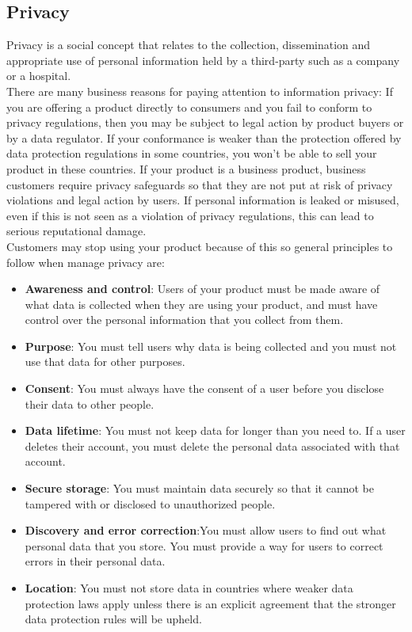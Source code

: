 \documentclass[10pt,a4paper]{report}
\begin{document}
\subsection{Privacy}
Privacy is a social concept that relates to the collection, dissemination and appropriate use of personal information held by a third-party such as a company or a hospital.\\
There are many business reasons for paying attention to information privacy: If you are offering a product directly to consumers and you fail to conform to privacy regulations, then you may be subject to legal action by product buyers or by a data regulator. If your conformance is weaker than the protection offered by data protection regulations in some countries, you won’t be able to sell your product in these countries. If your product is a business product, business customers require privacy safeguards so that they are not put at risk of privacy violations and legal action by users. If personal information is leaked or misused, even if this is not seen as a violation of privacy regulations, this can lead to serious reputational damage. \\
Customers may stop using your product because of this so general principles to follow when manage privacy are:
\begin{itemize}
	\item \textbf{Awareness and control}: Users of your product must be made aware of what data is collected when they are using your product, and must have control over the personal information that
	you collect from them.
	\item \textbf{Purpose}:	You must tell users why data is being collected and you must not use that data
	for other purposes. 
	\item \textbf{Consent}:	You must always have the consent of a user before you disclose their data to
	other people.
	\item \textbf{Data lifetime}: You must not keep data for longer than you need to. If a user deletes their
	account, you must delete the personal data associated with that account.
	\item \textbf{Secure storage}:	You must maintain data securely so that it cannot be tampered with or disclosed to unauthorized people.
	\item \textbf{Discovery and error correction}:You must allow users to find out what personal data that you store. You must	provide a way for users to correct errors in their personal data.
	\item \textbf{Location}: You must not store data in countries where weaker data protection laws apply
	unless there is an explicit agreement that the stronger data protection rules will
	be upheld.
\end{itemize}
\end{document}
